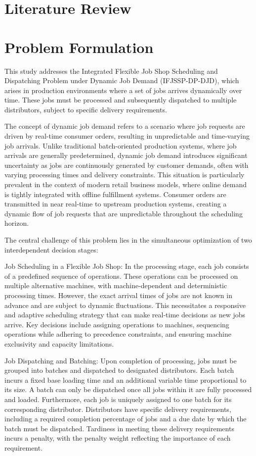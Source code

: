 \documentclass{article}
\begin{document}
\section{Literature Review}

\section{Problem Formulation}
This study addresses the Integrated Flexible Job Shop Scheduling and Dispatching Problem under Dynamic Job Demand (IFJSSP-DP-DJD), which arises in production environments where a set of jobs arrives dynamically over time. These jobs must be processed and subsequently dispatched to multiple distributors, subject to specific delivery requirements.

The concept of dynamic job demand refers to a scenario where job requests are driven by real-time consumer orders, resulting in unpredictable and time-varying job arrivals. Unlike traditional batch-oriented production systems, where job arrivals are generally predetermined, dynamic job demand introduces significant uncertainty as jobs are continuously generated by customer demands, often with varying processing times and delivery constraints. This situation is particularly prevalent in the context of modern retail business models, where online demand is tightly integrated with offline fulfillment systems. Consumer orders are transmitted in near real-time to upstream production systems, creating a dynamic flow of job requests that are unpredictable throughout the scheduling horizon.

The central challenge of this problem lies in the simultaneous optimization of two interdependent decision stages:

Job Scheduling in a Flexible Job Shop: In the processing stage, each job consists of a predefined sequence of operations. These operations can be processed on multiple alternative machines, with machine-dependent and deterministic processing times. However, the exact arrival times of jobs are not known in advance and are subject to dynamic fluctuations. This necessitates a responsive and adaptive scheduling strategy that can make real-time decisions as new jobs arrive. Key decisions include assigning operations to machines, sequencing operations while adhering to precedence constraints, and ensuring machine exclusivity and capacity limitations.

Job Dispatching and Batching: Upon completion of processing, jobs must be grouped into batches and dispatched to designated distributors. Each batch incurs a fixed base loading time and an additional variable time proportional to its size. A batch can only be dispatched once all jobs within it are fully processed and loaded. Furthermore, each job is uniquely assigned to one batch for its corresponding distributor. Distributors have specific delivery requirements, including a required completion percentage of jobs and a due date by which the batch must be dispatched. Tardiness in meeting these delivery requirements incurs a penalty, with the penalty weight reflecting the importance of each requirement.
\end{document}
